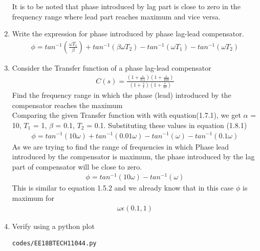 \begin{enumerate}[label=\thesection.\arabic*.,ref=\thesection.\theenumi]
It is to be noted that phase introduced by lag part is close to zero in the frequency range where lead part reaches maximum and vice versa.

\item Write the expression for phase introduced by phase lag-lead compensator. \\
\solution 
\begin{align}
    \phi = tan^{-1}(\frac{\omega T_1}{\beta}) + tan^{-1}( \beta \omega T_2) - tan^{-1}(\omega T_1) - tan^{-1}(\omega T_2)
\end{align}

\item Consider the Transfer function of a phase lag-lead compensator
\begin{align}
    C(s) = \frac{(1+\frac{s}{0.1})(1+\frac{s}{100})}{(1+\frac{s}{1})(1+\frac{s}{10})}
\end{align}
Find the frequency range in which the phase (lead) introduced by the compensator reaches the maximum \\ 
\solution 
Comparing the given Transfer function with with equation(1.7.1), we get $\alpha$ = 10, $T_1$ = 1, $\beta$ = 0.1, $T_2$ = 0.1.
Substituting these values in equation (1.8.1)
\begin{align}
    \phi = tan^{-1}(10\omega) + tan^{-1}(0.01\omega) - tan^{-1}(\omega) - tan^{-1}(0.1\omega)
\end{align}
As we are trying to find the range of frequencies in which Phase lead introduced by the compensator is maximum, the phase introduced by the lag part of compensator will be close to zero.
\begin{align}
    \phi = tan^{-1}(10 \omega ) - tan^{-1}(\omega )
\end{align}
This is similar to equation 1.5.2 and we already know that in this case $\phi$ is maximum for 
\begin{align}
    \omega \epsilon (0.1,1)
\end{align}

\item Verify using a python plot \\ 
\solution
\begin{lstlisting}
codes/EE18BTECH11044.py
\end{lstlisting}


\end{enumerate}
